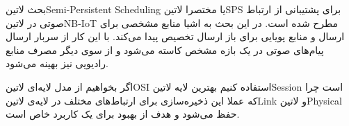 
بحث ‌لاتین{Semi-Persistent Scheduling} یا مختصرا ‌لاتین{SPS} برای پشتیبانی از ارتباط صوتی در ‌لاتین{NB-IoT}
مطرح شده است. در این بحث به اشیا منابع مشخصی برای ارسال و منابع پویایی برای باز ارسال تخصیص پیدا می‌کند. با این کار از سربار
ارسال پیام‌های صوتی در یک بازه مشخص کاسته می‌شود و از سوی دیگر مصرف منابع رادیویی نیز بهینه می‌شود.

اگر بخواهیم از مدل لایه‌ای ‌لاتین{OSI} استفاده کنیم بهترین لایه ‌لاتین{Session} است چرا که عملا این ذخیره‌سازی
برای ارتباط‌های مختلف در لایه‌ی ‌لاتین{Link} و ‌لاتین{Physical} حفظ می‌شود و هدف از بهبود برای یک کاربرد خاص است.
